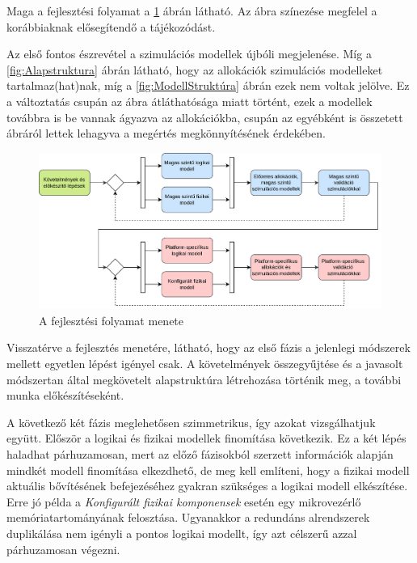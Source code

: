         Maga a fejlesztési folyamat a \ref{fig:Folyamat} ábrán látható. Az ábra színezése megfelel a korábbiaknak elősegítendő a tájékozódást.

        Az első fontos észrevétel a szimulációs modellek újbóli megjelenése. Míg a \ref{fig:Alapstruktura} ábrán látható, hogy az allokációk szimulációs modelleket tartalmaz(hat)nak, míg a \ref{fig:ModellStruktúra} ábrán ezek nem voltak jelölve.
        Ez a változtatás csupán az ábra átláthatósága miatt történt, ezek a modellek továbbra is be vannak ágyazva az allokációkba, csupán az egyébként is összetett ábráról lettek lehagyva a megértés megkönnyítésének érdekében.

        \begin{figure}[!ht]
            \centering
            \includegraphics[width=150mm, keepaspectratio]{figures/ParalelAllocationBasedFlowHU.drawio.png}
            \caption{A fejlesztési folyamat menete} 
            \label{fig:Folyamat}
        \end{figure}

        Visszatérve a fejlesztés menetére, látható, hogy az első fázis a jelenlegi módszerek mellett egyetlen lépést igényel csak. A követelmények összegyűjtése és a javasolt módszertan által megkövetelt alapstruktúra létrehozása történik meg, a további munka előkészítéseként.
        
        A következő két fázis meglehetősen szimmetrikus, így azokat vizsgálhatjuk együtt. Először a logikai és fizikai modellek finomítása következik. Ez a két lépés haladhat párhuzamosan, mert az előző fázisokból szerzett információk alapján mindkét modell finomítása elkezdhető, de meg kell említeni, hogy a fizikai modell aktuális bővítésének befejezéséhez gyakran szükséges a logikai modell elkészítése. Erre jó példa a \emph{Konfigurált fizikai komponensek} esetén egy mikrovezérlő memóriatartományának felosztása.
        Ugyanakkor a redundáns alrendszerek duplikálása nem igényli a pontos logikai modellt, így azt célszerű azzal párhuzamosan végezni.
        

